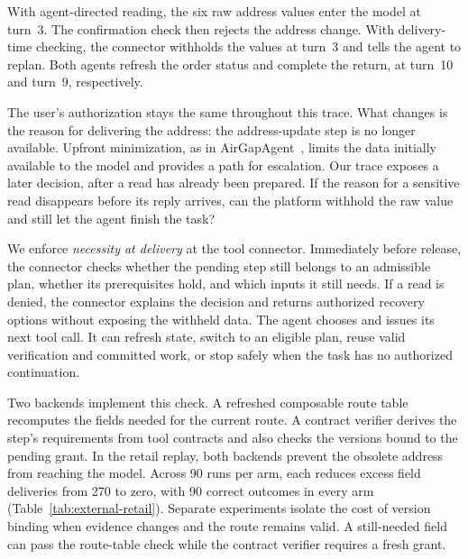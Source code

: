 \documentclass[10pt,twocolumn]{article}
\begin{document}
With agent-directed reading, the six raw address values enter the model at turn~3. The confirmation check then rejects the address change. With delivery-time checking, the connector withholds the values at turn~3 and tells the agent to replan. Both agents refresh the order status and complete the return, at turn~10 and turn~9, respectively.

The user's authorization stays the same throughout this trace. What changes is the reason for delivering the address: the address-update step is no longer available. Upfront minimization, as in AirGapAgent~\cite{airgap}, limits the data initially available to the model and provides a path for escalation. Our trace exposes a later decision, after a read has already been prepared. If the reason for a sensitive read disappears before its reply arrives, can the platform withhold the raw value and still let the agent finish the task?

We enforce \emph{necessity at delivery} at the tool connector. Immediately before release, the connector checks whether the pending step still belongs to an admissible plan, whether its prerequisites hold, and which inputs it still needs. If a read is denied, the connector explains the decision and returns authorized recovery options without exposing the withheld data. The agent chooses and issues its next tool call. It can refresh state, switch to an eligible plan, reuse valid verification and committed work, or stop safely when the task has no authorized continuation.

Two backends implement this check. A refreshed composable route table recomputes the fields needed for the current route. A contract verifier derives the step's requirements from tool contracts and also checks the versions bound to the pending grant. In the retail replay, both backends prevent the obsolete address from reaching the model. Across 90 runs per arm, each reduces excess field deliveries from 270 to zero, with 90 correct outcomes in every arm (Table~\ref{tab:external-retail}). Separate experiments isolate the cost of version binding when evidence changes and the route remains valid. A still-needed field can pass the route-table check while the contract verifier requires a fresh grant.
\end{document}

